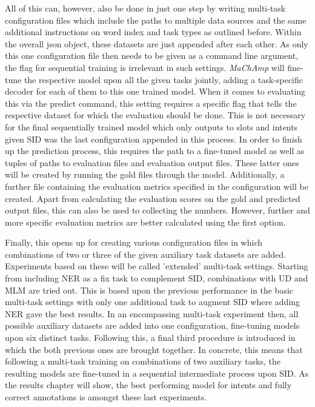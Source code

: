 \documentclass[11pt,a4paper,twoside,openright]{scrbook}
\begin{document}
All of this can, however, also be done in just one step by writing multi-task configuration files which include the paths to multiple data sources and the same additional instructions on word index and task types as outlined before. Within the overall json object, these datasets are just appended after each other. As only this one configuration file then needs to be given as a command line argument, the flag for sequential training is irrelevant in such settings. \textit{MaChAmp} will fine-tune the respective model upon all the given tasks jointly, adding a task-specific decoder for each of them to this one trained model. When it comes to evaluating this via the predict command, this setting requires a specific flag that tells the respective dataset for which the evaluation should be done. This is not necessary for the final sequentially trained model which only outputs to slots and intents given SID was the last configuration appended in this process. In order to finish up the prediction process, this requires the path to a fine-tuned model as well as tuples of paths to evaluation files and evaluation output files. These latter ones will be created by running the gold files through the model. Additionally, a further file containing the evaluation metrics specified in the configuration will be created. Apart from calculating the evaluation scores on the gold and predicted output files, this can also be used to collecting the numbers. However, further and more specific evaluation metrics are better calculated using the first option. 

Finally, this opens up for creating various configuration files in which combinations of two or three of the given auxiliary task datasets are added. Experiments based on these will be called 'extended' multi-task settings. Starting from including NER as a fix task to complement SID, combinations with UD and MLM are tried out. This is based upon the previous performance in the basic multi-task settings with only one additional task to augment SID where adding NER gave the best results. In an encompassing multi-task experiment then, all possible auxiliary datasets are added into one configuration, fine-tuning models upon six distinct tasks. Following this, a final third procedure is introduced in which the both previous ones are brought together. In concrete, this means that following a multi-task training on combinations of two auxiliary tasks, the resulting models are fine-tuned in a sequential intermediate process upon SID. As the results chapter will show, the best performing model for intents and fully correct annotations is amongst these last experiments.
\end{document}
